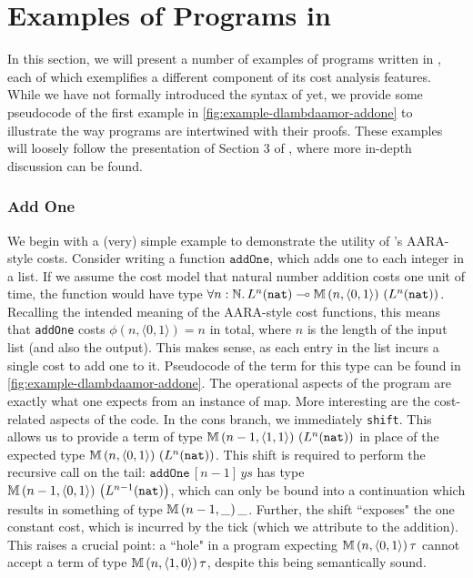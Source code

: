 \section{Examples of Programs in \dlambdaamor}
\label{sec:dlambdaamor-examples}
In this section, we will present a number of examples of programs written in \dlambdaamor, each of which exemplifies a different component of its cost analysis features. While we have not formally introduced the syntax of \dlambdaamor yet, we provide some pseudocode of the first example in \autoref{fig:example-dlambdaamor-addone} to illustrate the way programs are intertwined with their proofs. These examples will loosely follow the presentation of Section 3 of \citet{rajani-et-al:popl21}, where more in-depth discussion can be found.

\subsubsection{Add One}
We begin with a (very) simple example to demonstrate the utility of \dlambdaamor's AARA-style costs. Consider writing a function $\texttt{addOne}$, which adds one to each integer in a list. If we assume the cost model that natural number addition costs one unit of time, the function would have type $\forall n : \mathbb{N}. \, L^n(\texttt{nat}) \multimap \mathbb{M} \, (n,\langle 0,1 \rangle) \, \left(L^n(\texttt{nat})\right)$. Recalling the intended meaning of the AARA-style cost functions, this means that \texttt{addOne} costs $\phi(n,\langle 0,1 \rangle) = n$ in total, where $n$ is the length of the input list (and also the output). This makes sense, as each entry in the list incurs a single cost to add one to it. Pseudocode of the term for this type can be found in \autoref{fig:example-dlambdaamor-addone}. The operational aspects of the program are exactly what one expects from an instance of map. More interesting are the cost-related aspects of the code. In the cons branch, we immediately \texttt{shift}. This allows us to provide a term of type  $\mathbb{M} \, (n-1,\langle 1,1 \rangle) \, \left(L^n(\texttt{nat})\right)$ in place of the expected type $\mathbb{M} \, (n,\langle 0,1 \rangle) \, \left(L^n(\texttt{nat})\right)$. This shift is required to perform the recursive call on the tail: $\texttt{addOne} \, [n-1] \, ys$ has type $\mathbb{M} \, (n-1,\langle 0,1 \rangle) \, \left(L^{n-1} (\texttt{nat})\right)$, which can only be bound into a continuation which results in something of type $\mathbb{M} \, (n-1, \_) \, \_$. Further, the shift ``exposes" the one constant cost, which is incurred by the tick (which we attribute to the addition). This raises a crucial point: a ``hole" in a program expecting $\mathbb{M} \, (n,\langle 0,1 \rangle) \, \tau$ cannot accept a term of type $\mathbb{M} \, (n, \langle 1,0 \rangle) \, \tau$, despite this being semantically sound.

